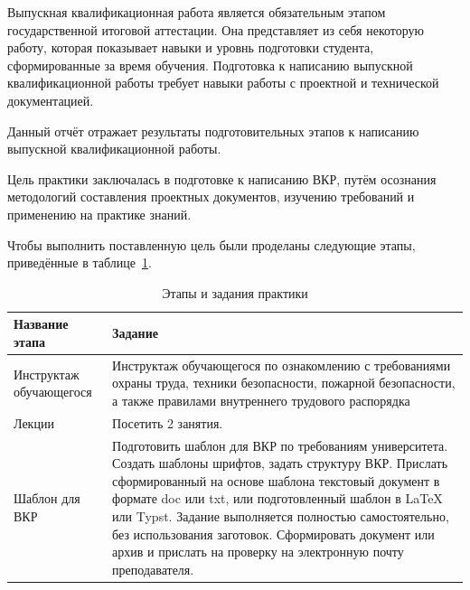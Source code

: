 
Выпускная квалификационная работа является обязательным этапом государственной итоговой аттестации. 
Она представляет из себя некоторую работу, которая показывает навыки и уровнь подготовки студента, сформированные за время обучения.
Подготовка к написанию выпускной квалификационной работы требует навыки работы с проектной и технической документацией. 

Данный отчёт отражает результаты подготовительных этапов к написанию выпускной квалификационной работы. 

Цель практики заключалась в подготовке к написанию ВКР, путём осознания методологий составления проектных документов, изучению требований и применению на практике знаний.

Чтобы выполнить поставленную цель были проделаны следующие этапы, приведённые в таблице~\ref{tab:practice-stages}.

\begin{table}[h]
  \centering
  \caption{Этапы и задания практики}
  \label{tab:practice-stages}
  \renewcommand{\arraystretch}{1.2}
  \begin{tabularx}{\textwidth}{|>{\raggedright\arraybackslash}p{}|>{\raggedright\arraybackslash}X|}
    \hline
    \textbf{Название этапа} & \textbf{Задание} \\
    \hline
    Инструктаж обучающегося & Инструктаж обучающегося по ознакомлению с требованиями охраны труда, техники безопасности, пожарной безопасности, а также правилами внутреннего трудового распорядка \\
    \hline
    Лекции & Посетить 2 занятия. \\
    \hline
    Шаблон для ВКР & Подготовить шаблон для ВКР по требованиям университета. Создать шаблоны шрифтов, задать структуру ВКР. Прислать сформированный на основе шаблона текстовый документ в формате doc или txt, или подготовленный шаблон в LaTeX или Typst. Задание выполняется полностью самостоятельно, без использования заготовок. Сформировать документ или архив и прислать на проверку на электронную почту преподавателя. \\
    \hline
  \end{tabularx}
\end{table}

